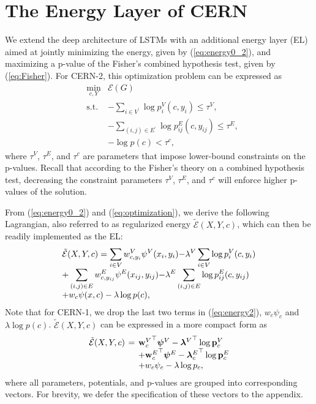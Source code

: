 \documentclass[10pt,twocolumn,letterpaper]{article}
\begin{document}
\section{The Energy Layer of CERN}
\label{sec:EL}
We extend the deep architecture of LSTMs with an additional energy layer (EL) aimed at jointly minimizing the energy, given by (\ref{eq:energy0_2}), and maximizing a p-value of the Fisher's combined hypothesis test, given by (\ref{eq:Fisher}).  For CERN-2, this optimization problem can be expressed as %
\begin{equation}
\begin{array}{lcl}
& \displaystyle \min_{c, Y} & \displaystyle \mathcal{E}(G)\\
 &\text{s.t.} & -\sum_{i\in V^\prime} \log p^V_i(c,y_i) \leq \tau^V,\\
 && -\sum_{(i,j) \in E^\prime} \log p^E_{ij}(c, y_{ij}) \leq \tau^E, \\
 && -\log p(c) < \tau^c,
 \end{array}
 \label{eq:optimization}
\end{equation}
where $\tau^V$, $\tau^E$, and $\tau^c$ are parameters that impose lower-bound constraints on the p-values. Recall that according to the Fisher's theory on a combined hypothesis test, decreasing the constraint parameters $\tau^V$, $\tau^E$, and $\tau^c$ will enforce higher p-values of the solution.

From (\ref{eq:energy0_2}) and (\ref{eq:optimization}), we derive the following Lagrangian, also referred to as  regularized energy $\tilde{\mathcal{E}}(X,Y, c)$, which can then be readily implemented as the EL:
\begin{equation}
\setlength{\arraycolsep}{0pt}
\begin{array}{l}
 \tilde{\mathcal{E}}(X,Y, c) =
 \displaystyle \sum_{i 
\in V}  w^V_{c,y_i}\psi^V(x_i,y_i){-} \lambda^V \sum_{i 
\in V}  \log p^V_i(c,y_i) \\ \displaystyle
+  \sum_{(i, j) \in E}w^E_{c,y_{ij}}  \psi^E(x_{ij},y_{ij}){-}  \lambda^E \sum_{(i, j) \in E}\log p^E_{ij}(c,y_{ij})\\
\displaystyle
+ w_c\psi(x, c) - \lambda\log p(c),
\end{array}
\label{eq:energy2}
\end{equation}
Note that for CERN-1, we drop the last two terms in (\ref{eq:energy2}), $w_c\psi_c$ and $\lambda\log p(c)$.
 $\tilde{\mathcal{E}}(X,Y, c)$ can be expressed in a more compact form as%
\begin{equation}
\setlength{\arraycolsep}{2pt}
\begin{array}{lcl}
 \tilde{\mathcal{E}}(X,Y, c) &=& {\ob_c^V}^\top\psib^V - {\lb^V}^\top \log\pb_c^V \\
 &&+ {\ob_c^E}^\top\psib^E - {\lb_c^E}^\top \log\pb_c^E \\
 &&+w_c\psi_c - \lambda\log p_c,
\end{array}
\label{eq:energy_c}
\end{equation}
where all parameters, potentials, and p-values are grouped into corresponding vectors. For brevity, we defer the specification of these vectors to the appendix.  
\end{document}
